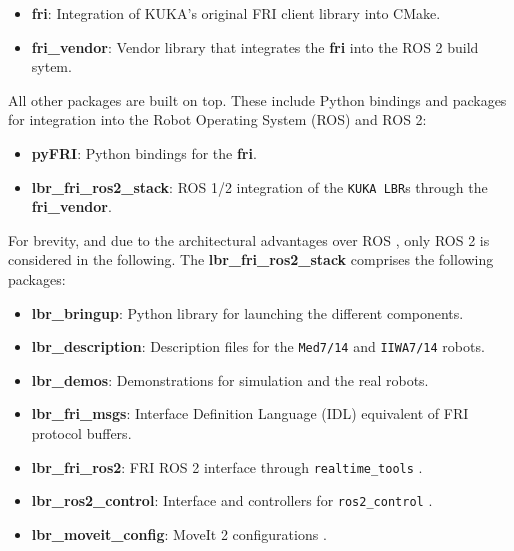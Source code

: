 \begin{itemize}
\item
  \textbf{fri}: Integration of KUKA's original FRI client library into
  CMake.
\item
  \textbf{fri\_vendor}: Vendor library that integrates the \textbf{fri}
  into the ROS 2 build sytem.
\end{itemize}

All other packages are built on top. These include Python bindings and
packages for integration into the Robot Operating System (ROS) and ROS
2:

\begin{itemize}
\item
  \textbf{pyFRI}: Python bindings for the \textbf{fri}.
\item
  \textbf{lbr\_fri\_ros2\_stack}: ROS 1/2 integration of the
  \texttt{KUKA\ LBR}s through the \textbf{fri\_vendor}.
\end{itemize}

For brevity, and due to the architectural advantages over ROS
\cite{ref-ros2}, only ROS 2 is
considered in the following. The \textbf{lbr\_fri\_ros2\_stack}
comprises the following packages:

\begin{itemize}
\item
  \textbf{lbr\_bringup}: Python library for launching the different
  components.
\item
  \textbf{lbr\_description}: Description files for the \texttt{Med7/14}
  and \texttt{IIWA7/14} robots.
\item
  \textbf{lbr\_demos}: Demonstrations for simulation and the real
  robots.
\item
  \textbf{lbr\_fri\_msgs}: Interface Definition Language (IDL)
  equivalent of FRI protocol buffers.
\item
  \textbf{lbr\_fri\_ros2}: FRI ROS 2 interface through
  \texttt{realtime\_tools} \cite{ref-ros_control}.
\item
  \textbf{lbr\_ros2\_control}: Interface and controllers for
  \texttt{ros2\_control} \cite{ref-ros2_control}.
\item
  \textbf{lbr\_moveit\_config}: MoveIt 2 configurations
  \cite{ref-moveit}.
\end{itemize}

